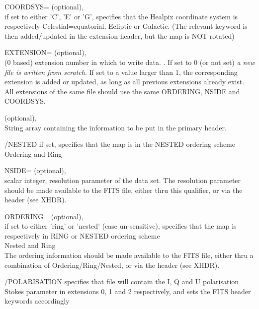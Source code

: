 \begin{keywords}
  \begin{kwlist}{} %
       \item[{COORDSYS=}]
		  (optional), \\
		if set to either 'C', 'E' or 'G',  specifies that the
		Healpix coordinate system is respectively Celestial=equatorial,
		  Ecliptic or Galactic.
		(The relevant keyword is then added/updated in the extension
		  header, but the map is NOT rotated)

	\item[{EXTENSION=}]
		  (optional), \\
	  (0 based) extension number in which to write data. .
	  If set to 0 (or not set) {\em a new file is written from scratch}.
	  If set to a value
		  larger than 1, the corresponding extension is added or
		  updated, as long as all previous extensions already exist.
		  All extensions of the same file should use the same ORDERING,
		  NSIDE and COORDSYS.

    	\item[HDR\mytarget{idl:write_fits_cut4:HDR}%
=] 	
		(optional), \\
		String array containing the information to be put in
		the primary header. 

	\item[{/NESTED}] if set, specifies that the map is in the NESTED ordering
	scheme\\
	\seealso Ordering and Ring 

	\item[{NSIDE=}] 
		(optional), \\
		scalar integer, \healpix resolution parameter of the
		data set. The resolution parameter should be made
		available to the FITS file, either thru this
		qualifier, or via the header (see XHDR).

	\item[{ORDERING=}]
		  (optional), \\
		if set to either 'ring' or 'nested' (case un-sensitive),
		  specifies that the map is respectively in RING or NESTED
		  ordering scheme\\
		\seealso Nested and Ring \\
	The ordering information should be made
		available to the FITS file, either thru a combination
		  of Ordering/Ring/Nested, or via the header (see XHDR).

	\item[{/POLARISATION}]
	  specifies that file will contain the I, Q and U polarisation
           Stokes parameter in extensions 0, 1 and 2 respectively, and sets the
FITS header keywords accordingly


\end{kwlist}
\end{keywords}
